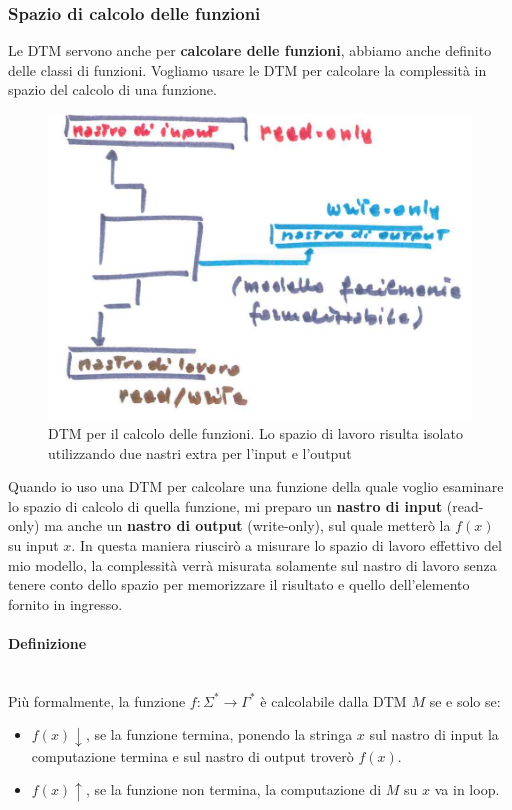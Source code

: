 \documentclass{article}
\begin{document}
\subsubsection{Spazio di calcolo delle funzioni}
Le DTM servono anche per \textbf{calcolare delle funzioni}, abbiamo anche definito delle classi
di funzioni. Vogliamo usare le DTM per calcolare la complessità in spazio
del calcolo di una funzione.
\begin{figure}[H]
    \centering
    \includegraphics[scale=0.6]{images/DTM_func.png}
    \caption{DTM per il calcolo delle funzioni. Lo spazio di lavoro risulta isolato
    utilizzando due nastri extra per l'input e l'output}
\end{figure}
Quando io uso una DTM per calcolare una funzione della quale voglio esaminare lo spazio
di calcolo di quella funzione, mi preparo un \textbf{nastro di input} (read-only)
ma anche un \textbf{nastro di output} (write-only),
sul quale metterò la $f(x)$ su input $x$. In questa maniera riuscirò a misurare lo spazio di lavoro
effettivo del mio modello, la complessità verrà misurata solamente sul nastro di lavoro senza
tenere conto dello spazio per memorizzare il risultato e quello dell'elemento fornito in ingresso.

\paragraph{Definizione}\mbox{}\\
Più formalmente, la funzione $f:\Sigma^*\rightarrow\Gamma^*$ è calcolabile dalla DTM $M$ se e solo se:
\begin{itemize}
    \item $f(x)\downarrow$, se la funzione termina, ponendo la stringa $x$ sul nastro di input la computazione
          termina e sul nastro di output troverò $f(x)$.
    \item $f(x)\uparrow$, se la funzione non termina, la computazione di $M$ su $x$ va in loop.
\end{itemize}
\end{document}
